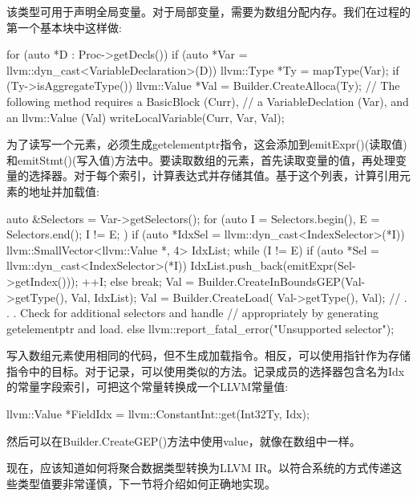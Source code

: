 该类型可用于声明全局变量。对于局部变量，需要为数组分配内存。我们在过程的第一个基本块中这样做:

\begin{cpp}
for (auto *D : Proc->getDecls()) {
    if (auto *Var =
            llvm::dyn_cast<VariableDeclaration>(D)) {
        llvm::Type *Ty = mapType(Var);
        if (Ty->isAggregateType()) {
            llvm::Value *Val = Builder.CreateAlloca(Ty);
            // The following method requires a BasicBlock (Curr),
            // a VariableDeclation (Var), and an llvm::Value (Val)
            writeLocalVariable(Curr, Var, Val);
        }
    }
}
\end{cpp}

为了读写一个元素，必须生成getelementptr指令，这会添加到emitExpr()(读取值)和emitStmt()(写入值)方法中。要读取数组的元素，首先读取变量的值，再处理变量的选择器。对于每个索引，计算表达式并存储其值。基于这个列表，计算引用元素的地址并加载值:

\begin{cpp}
auto &Selectors = Var->getSelectors();
for (auto I = Selectors.begin(), E = Selectors.end();
        I != E; ) {
    if (auto *IdxSel =
            llvm::dyn_cast<IndexSelector>(*I)) {
        llvm::SmallVector<llvm::Value *, 4> IdxList;
        while (I != E) {
            if (auto *Sel =
                    llvm::dyn_cast<IndexSelector>(*I)) {
                IdxList.push_back(emitExpr(Sel->getIndex()));
                ++I;
            } else
                break;
        }
        Val = Builder.CreateInBoundsGEP(Val->getType(), Val, IdxList);
        Val = Builder.CreateLoad(
            Val->getType(), Val);
    }
    // . . . Check for additional selectors and handle
    // appropriately by generating getelementptr and load.
    else {
        llvm::report_fatal_error("Unsupported selector");
    }
}
\end{cpp}

写入数组元素使用相同的代码，但不生成加载指令。相反，可以使用指针作为存储指令中的目标。对于记录，可以使用类似的方法。记录成员的选择器包含名为Idx的常量字段索引，可把这个常量转换成一个LLVM常量值:

\begin{cpp}
llvm::Value *FieldIdx = llvm::ConstantInt::get(Int32Ty, Idx);
\end{cpp}

然后可以在Builder.CreateGEP()方法中使用value，就像在数组中一样。

现在，应该知道如何将聚合数据类型转换为LLVM IR。以符合系统的方式传递这些类型值要非常谨慎，下一节将介绍如何正确地实现。













